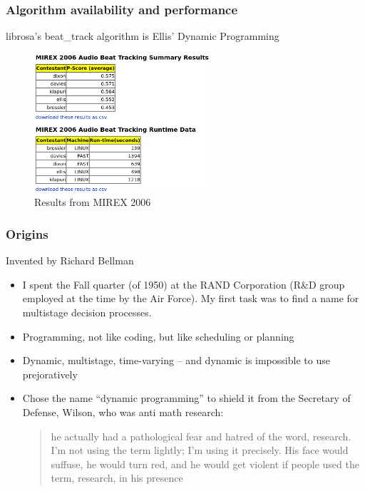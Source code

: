 \documentclass{beamer}
\begin{document}
\begin{frame}
	\frametitle{Algorithm availability and performance}
	librosa's beat\_track algorithm is Ellis' Dynamic Programming\\
	\begin{figure}
		\includegraphics[width=6.5cm]{./mirex2006.png}
		\caption{Results from MIREX 2006}
	\end{figure}
\end{frame}

\begin{frame}
	\frametitle{Origins}
	Invented by Richard Bellman
	\begin{itemize}
		\item
			I spent the Fall quarter (of 1950) at the RAND Corporation (R\&D group employed at the time by the Air Force). My first task was to find a name for multistage decision processes.
		\item
			Programming, not like coding, but like scheduling or planning
		\item
			Dynamic, multistage, time-varying -- and dynamic is impossible to use prejoratively
		\item
			Chose the name ``dynamic programming'' to shield it from the Secretary of Defense, Wilson, who was anti math research:
			\begin{quote}
			he actually had a pathological fear and hatred of the word, research. I’m not using the term lightly; I'm using it precisely. His face would suffuse, he would turn red, and he would get violent if people used the term, research, in his presence
			\end{quote}
	\end{itemize}
\end{frame}
\end{document}
